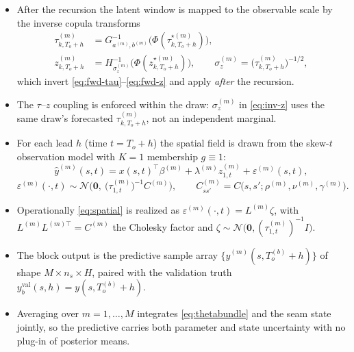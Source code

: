 \documentclass[11pt]{article}
\newcommand{\Norm}{\mathcal{N}}
\begin{document}
\begin{itemize}[leftmargin=1.4em]
  \item After the recursion the latent window is mapped to the
        observable scale by the inverse copula transforms
        \begin{align}
          \tau^{(m)}_{k,T_o+h}
            &= G^{-1}_{a^{(m)},b^{(m)}}\!\big(
                 \Phi(\tau^{\star(m)}_{k,T_o+h})\big),
          \label{eq:inv-tau}\\
          z^{(m)}_{k,T_o+h}
            &= H^{-1}_{\sigma^{(m)}_z}\!\big(
                 \Phi(z^{\star(m)}_{k,T_o+h})\big),
          \qquad
          \sigma^{(m)}_z = \big(\tau^{(m)}_{k,T_o+h}\big)^{-1/2},
          \label{eq:inv-z}
        \end{align}
        which invert \eqref{eq:fwd-tau}--\eqref{eq:fwd-z} and apply
        \emph{after} the recursion.
  \item The $\tau$--$z$ coupling is enforced within the draw:
        $\sigma^{(m)}_z$ in \eqref{eq:inv-z} uses the same draw's
        forecasted $\tau^{(m)}_{k,T_o+h}$, not an independent marginal.
  \item For each lead $h$ (time $t=T_o+h$) the spatial field is drawn
        from the skew-$t$ observation model with $K=1$ membership
        $g\equiv 1$:
        \begin{equation}
          \hat y^{(m)}(s,t)
          = x(s,t)^\top\beta^{(m)}
          + \lambda^{(m)} z^{(m)}_{1,t}
          + \varepsilon^{(m)}(s,t),
          \label{eq:obs-forecast}
        \end{equation}
        \begin{equation}
          \varepsilon^{(m)}(\cdot,t)\sim
            \Norm\!\Big(\bm 0,\ \big(\tau^{(m)}_{1,t}\big)^{-1} C^{(m)}\Big),
          \qquad
          C^{(m)}_{ss'} = C\big(s,s';\rho^{(m)},\nu^{(m)},\gamma^{(m)}\big).
          \label{eq:spatial}
        \end{equation}
  \item Operationally \eqref{eq:spatial} is realized as
        $\varepsilon^{(m)}(\cdot,t) = L^{(m)}\zeta$, with
        $L^{(m)}L^{(m)\top}=C^{(m)}$ the Cholesky factor and
        $\zeta\sim\Norm\!\big(\bm0,(\tau^{(m)}_{1,t})^{-1}I\big)$.
  \item The block output is the predictive sample array
        $\big\{\hat y^{(m)}(s,T_o^{(b)}+h)\big\}$ of shape
        $M\times n_s\times H$, paired with the validation truth
        $y^{\mathrm{val}}_b(s,h) = y(s,T_o^{(b)}+h)$.
  \item Averaging over $m=1,\dots,M$ integrates \eqref{eq:thetabundle}
        and the seam state jointly, so the predictive carries both
        parameter and state uncertainty with no plug-in of posterior
        means.
\end{itemize}
\end{document}
